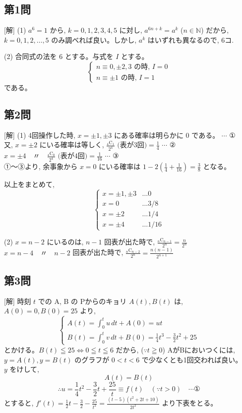\documentclass[../main.tex]{subfiles}
\begin{document}
\subsection*{第1問}

[解] (1) $a^6=1$ から, $k=0,1,2,3,4,5$ に対し, $a^{6n+k}=a^k$ ($n \in \mathbb{N}$) だから, $k=0,1,2,\dots,5$ のみ調べれば良い。しかし, $a^k$ はいずれも異なるので, 6コ.

(2) 合同式の法を 6 とする。与式を $I$ とする。
\[
  \begin{cases}
    n \equiv 0, \pm 2, 3 \text{ の時, } I = 0 \\
    n \equiv \pm 1 \text{ の時, } I = 1
  \end{cases}
\]
である。

\subsection*{第2問}

[解]
(1) 4回操作した時, $x=\pm 1, \pm 3$ にある確率は明らかに 0 である。 $\cdots$ ①\\
又, $x=\pm 2$ にいる確率は等しく, $\frac{{}_4\mathrm{C}_1}{2^4} \text{ (表が3回)} = \frac{1}{4}$ $\cdots$ ②\\
$x=\pm 4 \quad \text{〃} \quad \frac{{}_4\mathrm{C}_0}{2^4} \text{ (表が4回)} = \frac{1}{16}$ $\cdots$ ③\\
①〜③より, 余事象から $x=0$ にいる確率は $1-2\left(\frac{1}{4}+\frac{1}{16}\right) = \frac{3}{8}$ となる。

以上をまとめて,
\[
  \begin{cases}
    x = \pm 1, \pm 3 & \dots 0 \\
    x = 0 & \dots 3/8 \\
    x = \pm 2 & \dots 1/4 \\
    x = \pm 4 & \dots 1/16
  \end{cases}
\]

(2) $x=n-2$ にいるのは, $n-1$ 回表が出た時で, $\frac{{}_n\mathrm{C}_{n-1}}{2^n} = \frac{n}{2^n}$\\
$x=n-4 \quad \text{〃} \quad n-2$ 回表が出た時で, $\frac{{}_n\mathrm{C}_{n-2}}{2^n} = \frac{n(n-1)}{2^{n+1}}$

\subsection*{第3問}

[解] 時刻 $t$ での A, B の Pからのキョリ $A(t), B(t)$ は, $A(0)=0, B(0)=25$ より,
\[
  \begin{cases}
    A(t) = \int_0^t u \, dt + A(0) = ut \\
    B(t) = \int_0^t v \, dt + B(0) = \frac{1}{4}t^3 - \frac{3}{2}t^2 + 25
  \end{cases}
\]
とかける。$B(t) \leqq 25 \iff 0 \leqq t \leqq 6$ だから, ($\because t \geqq 0$) AがBにおいつくには, $y=A(t), y=B(t)$ のグラフが $0 < t < 6$ で少なくとも1回交われば良い。\\
$y$ をけして,
\[
  A(t) = B(t)
\]
\[
  \therefore u = \frac{1}{4}t^2 - \frac{3}{2}t + \frac{25}{t} \equiv f(t) \quad (\because t > 0) \quad \cdots \text{①}
\]
とすると, $f'(t) = \frac{1}{2}t - \frac{3}{2} - \frac{25}{t^2} = \frac{(t-5)(t^2+2t+10)}{2t^2}$ より下表をとる。
\end{document}
